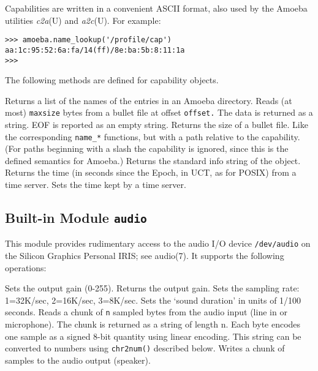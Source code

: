 Capabilities are written in a convenient ASCII format, also used by the
Amoeba utilities
{\em c2a}(U)
and
{\em a2c}(U).
For example:
\bcode\begin{verbatim}
>>> amoeba.name_lookup('/profile/cap')
aa:1c:95:52:6a:fa/14(ff)/8e:ba:5b:8:11:1a
>>>
\end{verbatim}\ecode
The following methods are defined for capability objects.
\begin{description}
Returns a list of the names of the entries in an Amoeba directory.
Reads (at most)
{\tt maxsize}
bytes from a bullet file at offset
{\tt offset.}
The data is returned as a string.
EOF is reported as an empty string.
Returns the size of a bullet file.
\itembreak
Like the corresponding
{\tt name\_*}
functions, but with a path relative to the capability.
(For paths beginning with a slash the capability is ignored, since this
is the defined semantics for Amoeba.)
Returns the standard info string of the object.
Returns the time (in seconds since the Epoch, in UCT, as for POSIX) from
a time server.
Sets the time kept by a time server.
\end{description}

\subsection{Built-in Module {\tt audio}}

This module provides rudimentary access to the audio I/O device
{\tt /dev/audio}
on the Silicon Graphics Personal IRIS; see audio(7).
It supports the following operations:
\begin{description}
Sets the output gain (0-255).
Returns the output gain.
Sets the sampling rate: 1=32K/sec, 2=16K/sec, 3=8K/sec.
Sets the `sound duration' in units of 1/100 seconds.
Reads a chunk of
{\tt n}
sampled bytes from the audio input (line in or microphone).
The chunk is returned as a string of length n.
Each byte encodes one sample as a signed 8-bit quantity using linear
encoding.
This string can be converted to numbers using {\tt chr2num()} described
below.
Writes a chunk of samples to the audio output (speaker).
\end{description}

